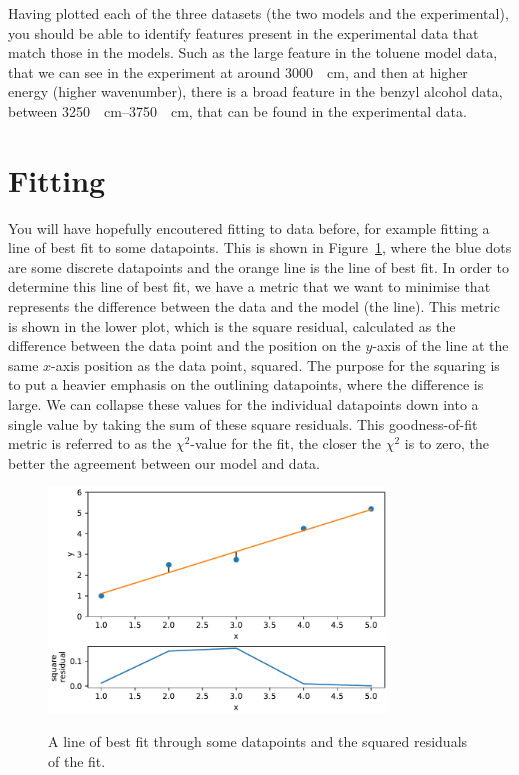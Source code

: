 \documentclass[a4paper]{article}
\begin{document}
Having plotted each of the three datasets (the two models and the experimental), you should be able to identify features present in the experimental data that match those in the models. 
Such as the large feature in the toluene model data, that we can see in the experiment at around \SI{3000}{\per\centi\meter}, and then at higher energy (higher wavenumber), there is a broad feature in the benzyl alcohol data, between \SIrange{3250}{3750}{\per\centi\meter}, that can be found in the experimental data. 

\section{Fitting}
You will have hopefully encoutered fitting to data before, for example fitting a line of best fit to some datapoints.
This is shown in Figure~\ref{fig:plot}, where the blue dots are some discrete datapoints and the orange line is the line of best fit. 
In order to determine this line of best fit, we have a metric that we want to minimise that represents the difference between the data and the model (the line).
This metric is shown in the lower plot, which is the square residual, calculated as the difference between the data point and the position on the $y$-axis of the line at the same $x$-axis position as the data point, squared.
The purpose for the squaring is to put a heavier emphasis on the outlining datapoints, where the difference is large. 
We can collapse these values for the individual datapoints down into a single value by taking the sum of these square residuals.
This goodness-of-fit metric is referred to as the $\chi^2$-value for the fit, the closer the $\chi^2$ is to zero, the better the agreement between our model and data. 
%
\begin{figure}[t]
  \centering
  \includegraphics[width=0.8\textwidth]{residual}
  \label{fig:plot}
  \caption{A line of best fit through some datapoints and the squared residuals of the fit.}
  \end{figure}
%
\end{document}
